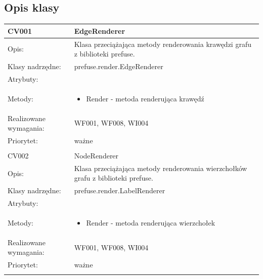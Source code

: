 \documentclass[a4paper,10pt]{article}
\begin{document}
\subsection{Opis klasy}

\begin{center}
 

\begin{longtable}{|m{3cm}|m{9cm}|} \hline

CV001 & EdgeRenderer \\ \hline
Opis: & Klasa przeciążająca metody renderowania krawędzi grafu z biblioteki prefuse. \\ \hline
Klasy nadrzędne: &  prefuse.render.EdgeRenderer   \\ \hline
Atrybuty: & %
 \\ \hline
Metody: & \begin{itemize}
 \item Render - metoda renderująca krawędź
\end{itemize}
  \\ \hline
Realizowane wymagania: & WF001, WF008, WI004 \\ \hline
Priorytet: & ważne  \\ \hline

\multicolumn{2}{c}{} \\
 \hline

CV002 & NodeRenderer \\ \hline
Opis: & Klasa przeciążająca metody renderowania wierzchołków grafu z biblioteki prefuse.    \\ \hline
Klasy nadrzędne: &  prefuse.render.LabelRenderer   \\ \hline
Atrybuty: & %
 \\ \hline
Metody: & \begin{itemize}
 \item Render - metoda renderująca wierzchołek
\end{itemize}
  \\ \hline
Realizowane wymagania: & WF001, WF008, WI004 \\ \hline
Priorytet: & ważne  \\ \hline

\multicolumn{2}{c}{} \\
 \hline


\end{longtable}
\end{center}
\end{document}
